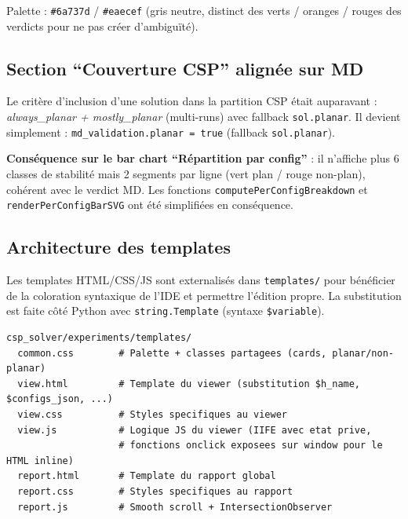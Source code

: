 Palette : \texttt{\#6a737d} / \texttt{\#eaecef} (gris neutre, distinct des verts /
oranges / rouges des verdicts pour ne pas créer d'ambiguïté).

\subsection{Section ``Couverture CSP'' alignée sur MD}


Le critère d'inclusion d'une solution dans la partition CSP était auparavant :
\textit{always\_planar + mostly\_planar} (multi-runs) avec fallback \texttt{sol.planar}.
Il devient simplement : \texttt{md\_validation.planar = true} (fallback \texttt{sol.planar}).

\textbf{Conséquence sur le bar chart ``Répartition par config''} : il n'affiche plus 6 classes
de stabilité mais 2 segments par ligne (vert plan / rouge non-plan), cohérent avec le
verdict MD. Les fonctions \texttt{computePerConfigBreakdown} et \texttt{renderPerConfigBarSVG}
ont été simplifiées en conséquence.

\subsection{Architecture des templates}

Les templates HTML/CSS/JS sont externalisés dans \texttt{templates/} pour bénéficier de la
coloration syntaxique de l'IDE et permettre l'édition propre. La substitution est faite côté
Python avec \texttt{string.Template} (syntaxe \texttt{\$variable}).

\begin{lstlisting}[style=benzai]
csp_solver/experiments/templates/
  common.css        # Palette + classes partagees (cards, planar/non-planar)
  view.html         # Template du viewer (substitution $h_name, $configs_json, ...)
  view.css          # Styles specifiques au viewer
  view.js           # Logique JS du viewer (IIFE avec etat prive,
                    # fonctions onclick exposees sur window pour le HTML inline)
  report.html       # Template du rapport global
  report.css        # Styles specifiques au rapport
  report.js         # Smooth scroll + IntersectionObserver
\end{lstlisting}

